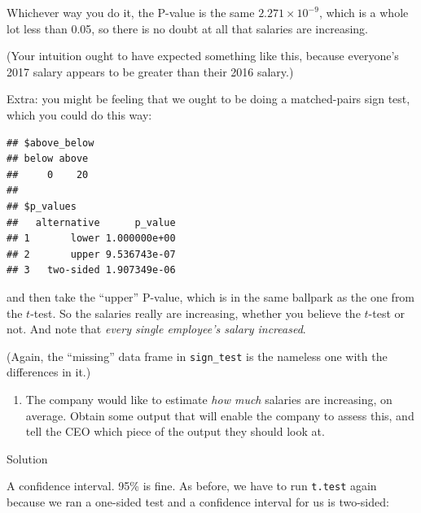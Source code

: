 \documentclass[]{tufte-book}
\newenvironment{Shaded}{}{}
\newcommand{\DataTypeTok}[1]{\textcolor[rgb]{0.56,0.13,0.00}{#1}}
\newcommand{\DecValTok}[1]{\textcolor[rgb]{0.25,0.63,0.44}{#1}}
\newcommand{\KeywordTok}[1]{\textcolor[rgb]{0.00,0.44,0.13}{\textbf{#1}}}
\newcommand{\NormalTok}[1]{#1}
\newcommand{\OperatorTok}[1]{\textcolor[rgb]{0.40,0.40,0.40}{#1}}
\newcommand{\StringTok}[1]{\textcolor[rgb]{0.25,0.44,0.63}{#1}}
\providecommand{\tightlist}{%
  \setlength{\itemsep}{0pt}\setlength{\parskip}{0pt}}
\theoremstyle{definition}
\theoremstyle{definition}
\theoremstyle{definition}
\theoremstyle{remark}
\begin{document}
Whichever way you do it, the P-value is the same
\(2.271 \times 10^{-9}\), which is a whole lot less than 0.05, so there
is no doubt at all that salaries are increasing.

(Your intuition ought to have expected something like this, because
everyone's 2017 salary appears to be greater than their 2016 salary.)

Extra: you might be feeling that we ought to be doing a matched-pairs
sign test, which you could do this way:

\begin{Shaded}
\end{Shaded}

\begin{verbatim}
## $above_below
## below above 
##     0    20 
## 
## $p_values
##   alternative      p_value
## 1       lower 1.000000e+00
## 2       upper 9.536743e-07
## 3   two-sided 1.907349e-06
\end{verbatim}

and then take the ``upper'' P-value, which is in the same ballpark as
the one from the \(t\)-test. So the salaries really are increasing,
whether you believe the \(t\)-test or not. And note that \emph{every
single employee's salary increased}.

(Again, the ``missing'' data frame in \texttt{sign\_test} is the
nameless one with the differences in it.)

\begin{enumerate}
\def\labelenumi{(\alph{enumi})}
\setcounter{enumi}{4}
\tightlist
\item
  The company would like to estimate \emph{how
  much} salaries are increasing, on average. Obtain some output that
  will enable the company to assess this, and tell the CEO which piece
  of the output they should look at.
\end{enumerate}

Solution

A confidence interval. 95\% is fine. As before, we have to run
\texttt{t.test} again because we ran a one-sided test and a confidence
interval for us is two-sided:
\end{document}
